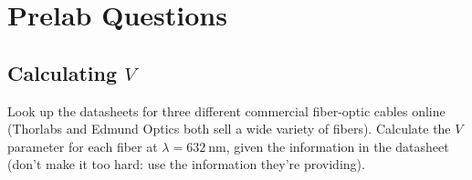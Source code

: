\documentclass[]{manual}
\begin{document}
    \FloatBarrier
    \newpage

    \section*{Prelab Questions}
    \setcounter{subsection}{0}

    \subsection*{Calculating $V$}

    Look up the datasheets for three different commercial fiber-optic cables online (Thorlabs and Edmund Optics both sell a wide variety of fibers).
    Calculate the $V$ parameter for each fiber at $\lambda = \SI{632}{\nano\meter}$, given the information in the datasheet (don't make it too hard: use the information they're providing).

\end{document}
